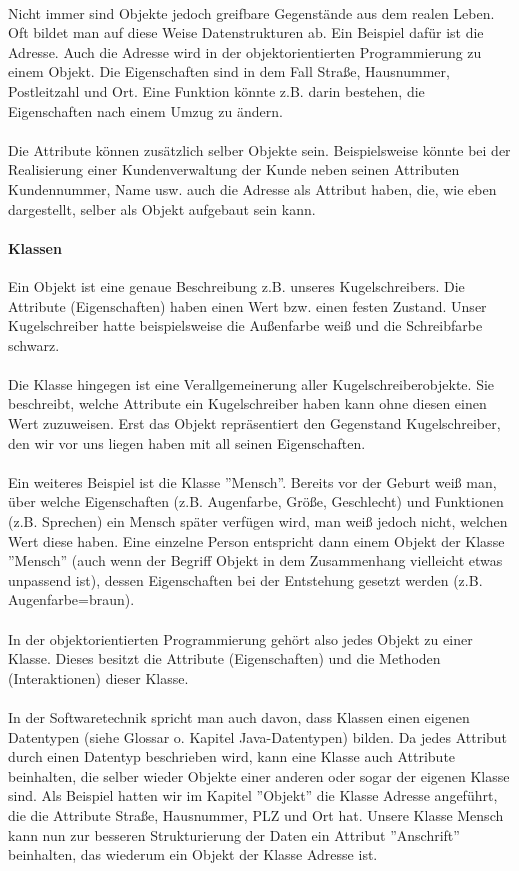 \\
Nicht immer sind Objekte jedoch greifbare Gegenstände aus dem realen Leben. Oft bildet man auf diese Weise Datenstrukturen ab. Ein Beispiel dafür ist die Adresse. Auch die Adresse wird in der objektorientierten Programmierung zu einem Objekt. Die Eigenschaften sind in dem Fall Straße, Hausnummer, Postleitzahl und Ort. Eine Funktion könnte z.B. darin bestehen, die Eigenschaften nach einem Umzug zu ändern.\\
\\
Die Attribute können zusätzlich selber Objekte sein. Beispielsweise könnte bei der Realisierung einer Kundenverwaltung der Kunde neben seinen Attributen Kundennummer, Name usw. auch die Adresse als Attribut haben, die, wie eben dargestellt, selber als Objekt aufgebaut sein kann.

\paragraph{Klassen}
Ein Objekt ist eine genaue Beschreibung z.B. unseres Kugelschreibers. Die Attribute (Eigenschaften) haben  einen Wert bzw. einen festen Zustand. Unser Kugelschreiber hatte beispielsweise die Außenfarbe weiß und die Schreibfarbe schwarz.\\
\\
Die Klasse hingegen ist eine Verallgemeinerung aller Kugelschreiberobjekte. Sie beschreibt, welche Attribute ein Kugelschreiber haben kann ohne diesen einen Wert zuzuweisen. Erst das Objekt repräsentiert den Gegenstand Kugelschreiber, den wir vor uns liegen haben mit  all seinen Eigenschaften.\\
\\
Ein weiteres Beispiel ist die Klasse ''Mensch''. Bereits vor der Geburt weiß man, über welche Eigenschaften (z.B. Augenfarbe, Größe, Geschlecht) und Funktionen (z.B. Sprechen) ein Mensch später verfügen wird, man weiß jedoch nicht, welchen Wert diese haben. Eine einzelne Person entspricht dann einem Objekt der Klasse ''Mensch'' (auch wenn der Begriff Objekt in dem Zusammenhang vielleicht etwas unpassend ist), dessen Eigenschaften bei der Entstehung gesetzt werden (z.B. Augenfarbe=braun).\\
\\
In der objektorientierten Programmierung  gehört also jedes Objekt zu einer Klasse. Dieses besitzt die Attribute (Eigenschaften) und die Methoden (Interaktionen) dieser Klasse.\\
\\
In der Softwaretechnik spricht man auch davon, dass Klassen einen eigenen Datentypen (siehe Glossar o. Kapitel Java-Datentypen) bilden. Da jedes Attribut durch einen Datentyp beschrieben wird, kann eine Klasse auch Attribute beinhalten, die selber wieder Objekte einer anderen oder sogar der eigenen Klasse sind. Als Beispiel hatten wir im Kapitel ''Objekt'' die Klasse Adresse angeführt, die die Attribute Straße, Hausnummer, PLZ und Ort hat. Unsere Klasse Mensch kann nun zur besseren Strukturierung der Daten  ein Attribut ''Anschrift'' beinhalten, das wiederum ein Objekt der Klasse Adresse ist.\\
